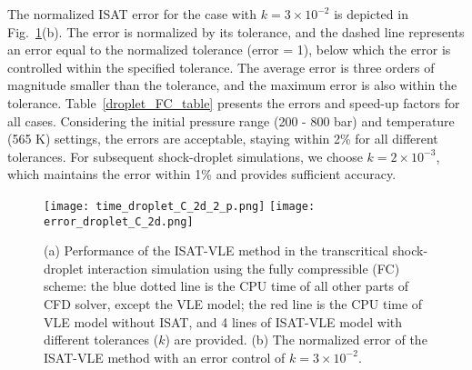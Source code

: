 The normalized ISAT error for the case with $k=3\times10^{-2}$ is depicted in Fig.~\ref{droplet_PE}(b). The error is normalized by its tolerance, and the dashed line represents an error equal to the normalized tolerance (error = 1), below which the error is controlled within the specified tolerance. The average error is three orders of magnitude smaller than the tolerance, and the maximum error is also within the tolerance. Table~\ref{droplet_FC_table} presents the errors and speed-up factors for all cases. Considering the initial pressure range (200 - 800 bar) and temperature (565 K) settings, the errors are acceptable, staying within 2\% for all different tolerances. For subsequent shock-droplet simulations, we choose $k=2 \times 10^{-3}$, which maintains the error within 1\% and provides sufficient accuracy.



\begin{figure}[htbp]
\centering
\texttt{[image: time\_droplet\_C\_2d\_2\_p.png]}
\texttt{[image: error\_droplet\_C\_2d.png]}
\caption{(a) Performance of the ISAT-VLE method in the transcritical shock-droplet interaction simulation using the fully compressible (FC) scheme: the blue dotted line is the CPU time of all other parts of CFD solver, except the VLE model; the red line is the CPU time of VLE model without ISAT, and 4 lines of ISAT-VLE model with different tolerances ($k$) are provided. (b) The normalized error of the ISAT-VLE method with an error control of $k = 3 \times 10^{-2}$.}
\label{droplet_PE} 
\end{figure}


